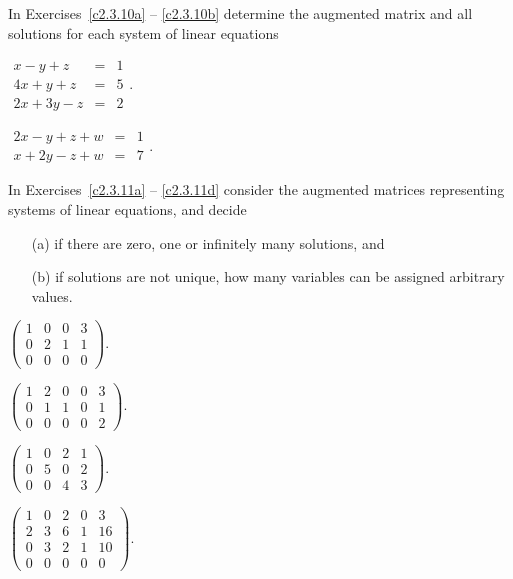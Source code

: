 \documentclass{ximera}
\begin{document}
\noindent In Exercises~\ref{c2.3.10a} -- \ref{c2.3.10b} determine the
augmented matrix and all solutions for each system of linear equations
\begin{exercise} \label{c2.3.10a}
$\begin{array}{rcl}
x-y+z & = & 1 \\
4x+y+z & = & 5 \\
2x+3y-z & = & 2 \end{array}$.
\end{exercise}
\begin{exercise} \label{c2.3.10b}
$\begin{array}{rcl}
2x-y+z+w & = & 1\\
x+2y-z+w & = & 7 \end{array}$.
\end{exercise}

\noindent In Exercises~\ref{c2.3.11a} -- \ref{c2.3.11d} consider the
augmented matrices representing systems of linear equations, and decide
\begin{itemize}
\item[(a)] if there are zero, one or infinitely many solutions, and
\item[(b)] if solutions are not unique, how many variables can be
assigned arbitrary values.
\end{itemize}
\begin{exercise} \label{c2.3.11a}
$\left(\begin{array}{ccc|c} 1 & 0 & 0 &3 \\0 & 2 & 1 & 1\\ 0 & 0 & 0 & 0
\end{array}\right)$.
\end{exercise}
\begin{exercise} \label{c2.3.11b}
$\left(\begin{array}{cccc|c} 1 & 2 & 0 & 0 & 3\\ 0 & 1 & 1 & 0 & 1\\
0 & 0 & 0 & 0 & 2 \end{array}\right)$.
\end{exercise}
\begin{exercise} \label{c2.3.11c}
$\left(\begin{array}{ccc|c}  1 & 0 & 2 & 1\\ 0 & 5 & 0 & 2 \\ 0 & 0 & 4 & 3
\end{array}\right)$.
\end{exercise}
\begin{exercise} \label{c2.3.11d}
$\left(\begin{array}{cccc|c} 1 & 0 & 2 & 0 & 3 \\ 2 & 3 & 6 & 1 & 16\\
0 & 3 & 2 & 1 & 10 \\ 0 & 0 & 0 & 0 & 0  \end{array}\right)$.
\end{exercise}
\end{document}
